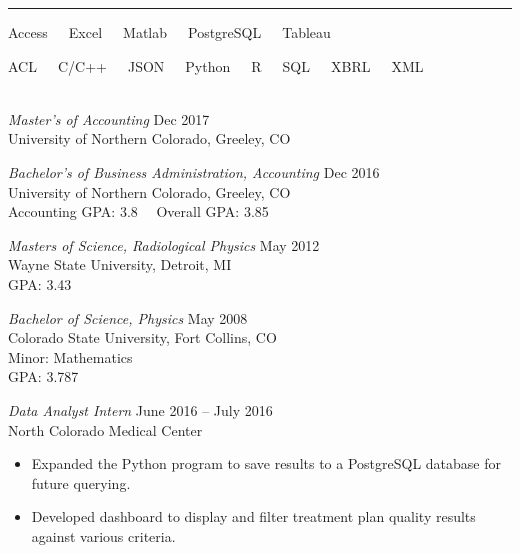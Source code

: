 \documentclass{article}
\begin{document}
\vskip2mm
\hrule
{}

\begin{description}[leftmargin=!,labelwidth=3cm]


\item[Tools]
Access\ \ \ Excel\ \ \ Matlab\ \ \ PostgreSQL\ \ \ Tableau

\item[Languages]
ACL\ \ \ C/C++\ \ \ JSON\ \ \ Python\ \ \ R\ \ \ SQL\ \ \ XBRL\ \ \ XML\\\ \\
 
\item[Education]
{\sl Master's of Accounting} \hfill Dec 2017\\
University of Northern Colorado, Greeley, CO

{\sl Bachelor's of Business Administration, Accounting} \hfill Dec 2016\\
University of Northern Colorado, Greeley, CO\\
Accounting GPA: 3.8 \qquad\ \  Overall GPA: 3.85

{\sl Masters of Science, Radiological Physics} \hfill May 2012\\
Wayne State University, Detroit, MI\\
GPA: 3.43

{\sl Bachelor of Science, Physics} \hfill May 2008\\
Colorado State University, Fort Collins, CO \\
Minor: Mathematics\\
GPA: 3.787

\item[Experience]
{\sl Data Analyst Intern} \hfill June 2016 -- July 2016\\North Colorado Medical Center
\begin{itemize}[rightmargin=4.3cm]
    \item Expanded the Python program to save results to a PostgreSQL database for future querying.
    \item Developed dashboard to display and filter treatment plan quality results against various criteria.
\end{itemize}


\end{description}
\end{document}
